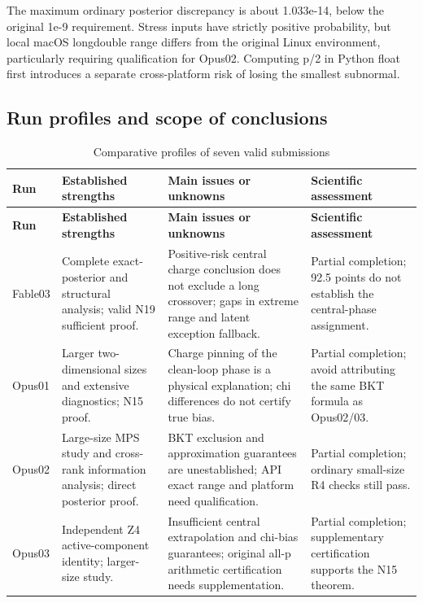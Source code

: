 \documentclass[11pt,a4paper]{article}
\begin{document}
The maximum ordinary posterior discrepancy is about 1.033e-14,\allowbreak{} below the original 1e-9 requirement. Stress inputs have strictly positive probability,\allowbreak{} but local macOS longdouble range differs from the original Linux environment,\allowbreak{} particularly requiring qualification for Opus02. Computing p/\allowbreak{}2 in Python float first introduces a separate cross-platform risk of losing the smallest subnormal.

\clearpage
\subsection{Run profiles and scope of conclusions}
{\fontsize{9.0}{12.6}\selectfont
\setlength{\tabcolsep}{2.5pt}
\begin{longtable}{>{\raggedright\arraybackslash}p{}>{\raggedright\arraybackslash}p{}>{\raggedright\arraybackslash}p{}>{\raggedright\arraybackslash}p{}}
\caption{Comparative profiles of seven valid submissions}\\
\toprule
\textbf{Run} & \textbf{Established strengths} & \textbf{Main issues or unknowns} & \textbf{Scientific assessment}\tabularnewline
\midrule
\endfirsthead
\toprule
\textbf{Run} & \textbf{Established strengths} & \textbf{Main issues or unknowns} & \textbf{Scientific assessment}\tabularnewline
\midrule
\endhead
{}Fable03 & Complete exact-posterior and structural analysis; valid N19 sufficient proof. & Positive-risk central charge conclusion does not exclude a long crossover; gaps in extreme range and latent exception fallback. & Partial completion; 92.5 points do not establish the central-phase assignment.\tabularnewline
{}Opus01 & Larger two-dimensional sizes and extensive diagnostics; N15 proof. & Charge pinning of the clean-loop phase is a physical explanation; chi differences do not certify true bias. & Partial completion; avoid attributing the same BKT formula as Opus02/\allowbreak{}03.\tabularnewline
{}Opus02 & Large-size MPS study and cross-rank information analysis; direct posterior proof. & BKT exclusion and approximation guarantees are unestablished; API exact range and platform need qualification. & Partial completion; ordinary small-size R4 checks still pass.\tabularnewline
{}Opus03 & Independent Z4 active-component identity; larger-size study. & Insufficient central extrapolation and chi-bias guarantees; original all-p arithmetic certification needs supplementation. & Partial completion; supplementary certification supports the N15 theorem.\tabularnewline

\end{longtable}}
\end{document}
